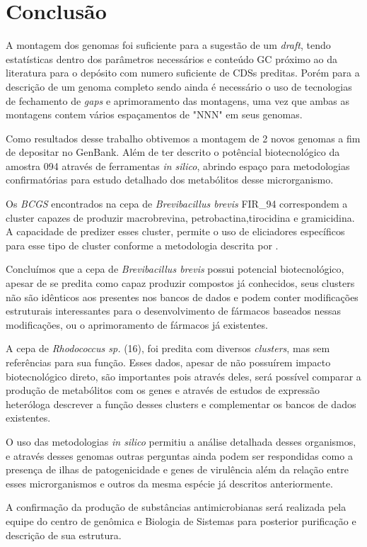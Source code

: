 \chapter{Conclusão}
\label{conclusao}


A montagem dos genomas foi suficiente para a sugestão de um \textit{draft}, tendo
estatísticas dentro dos parâmetros necessários e conteúdo GC próximo ao da literatura para o depósito com numero suficiente de CDSs preditas. Porém para a descrição
de um genoma completo sendo ainda é necessário o uso de tecnologias de fechamento de \textit{gaps} e aprimoramento
das montagens, uma vez que ambas as montagens contem vários espaçamentos de "NNN" em seus genomas.

Como resultados desse trabalho obtivemos a montagem de 2 novos genomas a fim de depositar no GenBank. Além de ter descrito o potêncial biotecnológico da amostra 094
através de ferramentas \textit{in silico}, abrindo espaço para metodologias confirmatórias para
estudo detalhado dos metabólitos desse microrganismo.

Os \textit{BCGS} encontrados na cepa de \textit{Brevibacillus brevis} FIR\_94 correspondem a cluster capazes de produzir macrobrevina,
petrobactina,tirocidina e gramicidina. A capacidade de predizer esses cluster, permite o
uso de eliciadores específicos para esse tipo de cluster conforme a metodologia descrita por .

Concluímos que a cepa de \textit{Brevibacillus brevis } possui potencial biotecnológico, apesar de se predita 
como capaz produzir compostos já conhecidos, seus clusters não são idênticos aos presentes nos bancos 
de dados e podem conter modificações estruturais interessantes para o desenvolvimento
de fármacos baseados nessas modificações, ou o aprimoramento de fármacos já existentes.

A cepa de \textit{Rhodococcus sp.} (16), foi predita  com diversos \textit{clusters}, mas sem referências para sua função. 
Esses dados, apesar de não possuírem impacto biotecnológico direto, são importantes pois através deles, será possível comparar a produção
de metabólitos com os genes e através de estudos de expressão heteróloga descrever a função
desses clusters e complementar os bancos de dados existentes.


O uso das metodologias \textit{in silico} permitiu a análise detalhada desses organismos, e através desses genomas
outras perguntas ainda  podem ser respondidas como a presença de ilhas de patogenicidade e genes de virulência
além da relação entre esses microrganismos e outros da mesma espécie já descritos anteriormente.

A confirmação da produção de substâncias antimicrobianas será realizada pela equipe do centro de genômica
e Biologia de Sistemas para posterior purificação e descrição de sua estrutura.